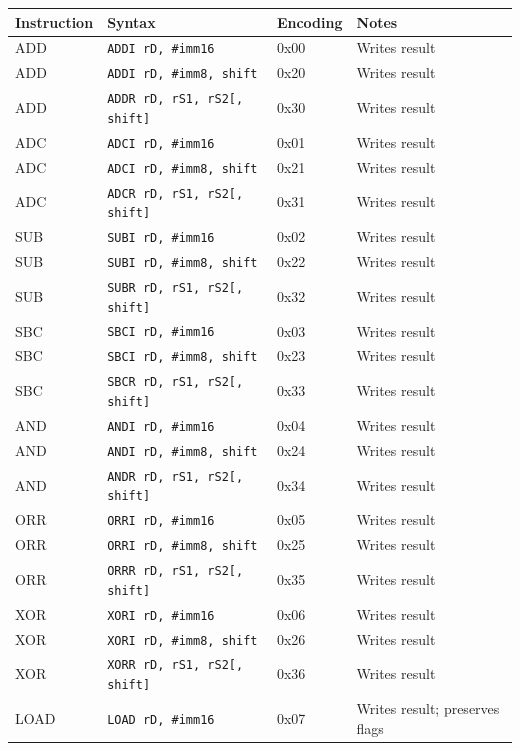 \begin{table}[H]
	\centering
	\scriptsize
	\begin{tabular}{llll}
		\toprule
		\textbf{Instruction} & \textbf{Syntax} & \textbf{Encoding} & \textbf{Notes} \\
		\midrule
		ADD  & \texttt{ADDI rD, \#imm16} & 0x00 & Writes result \\
		ADD  & \texttt{ADDI rD, \#imm8, shift} & 0x20 & Writes result \\
		ADD  & \texttt{ADDR rD, rS1, rS2[, shift]} & 0x30 & Writes result \\
		ADC  & \texttt{ADCI rD, \#imm16} & 0x01 & Writes result \\
		ADC  & \texttt{ADCI rD, \#imm8, shift} & 0x21 & Writes result \\
		ADC  & \texttt{ADCR rD, rS1, rS2[, shift]} & 0x31 & Writes result \\
		SUB  & \texttt{SUBI rD, \#imm16} & 0x02 & Writes result \\
		SUB  & \texttt{SUBI rD, \#imm8, shift} & 0x22 & Writes result \\
		SUB  & \texttt{SUBR rD, rS1, rS2[, shift]} & 0x32 & Writes result \\
		SBC  & \texttt{SBCI rD, \#imm16} & 0x03 & Writes result \\
		SBC  & \texttt{SBCI rD, \#imm8, shift} & 0x23 & Writes result \\
		SBC  & \texttt{SBCR rD, rS1, rS2[, shift]} & 0x33 & Writes result \\
		AND  & \texttt{ANDI rD, \#imm16} & 0x04 & Writes result \\
		AND  & \texttt{ANDI rD, \#imm8, shift} & 0x24 & Writes result \\
		AND  & \texttt{ANDR rD, rS1, rS2[, shift]} & 0x34 & Writes result \\
		ORR  & \texttt{ORRI rD, \#imm16} & 0x05 & Writes result \\
		ORR  & \texttt{ORRI rD, \#imm8, shift} & 0x25 & Writes result \\
		ORR  & \texttt{ORRR rD, rS1, rS2[, shift]} & 0x35 & Writes result \\
		XOR  & \texttt{XORI rD, \#imm16} & 0x06 & Writes result \\
		XOR  & \texttt{XORI rD, \#imm8, shift} & 0x26 & Writes result \\
		XOR  & \texttt{XORR rD, rS1, rS2[, shift]} & 0x36 & Writes result \\
		LOAD & \texttt{LOAD rD, \#imm16} & 0x07 & Writes result; preserves flags \\

\end{tabular}
\end{table}
